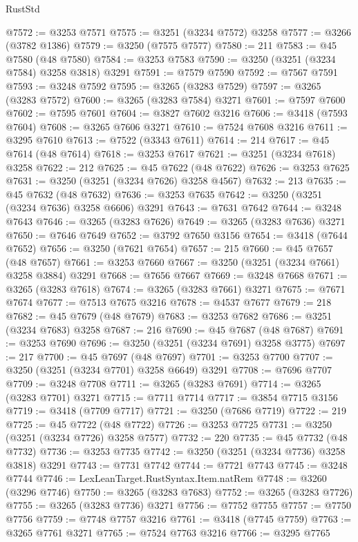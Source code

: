 \begin{lexlean}{RustStd}
\begin{coremodule}
@7572 := @3253 @7571
@7575 := @3251 (@3234 @7572) @3258
@7577 := @3266 (@3782 @1386)
@7579 := @3250 (@7575 @7577)
@7580 := 211
@7583 := @45 @7580 (@48 @7580)
@7584 := @3253 @7583
@7590 := @3250 (@3251 (@3234 @7584) @3258 @3818) @3291
@7591 := @7579 @7590
@7592 := @7567 @7591
@7593 := @3248 @7592
@7595 := @3265 (@3283 @7529)
@7597 := @3265 (@3283 @7572)
@7600 := @3265 (@3283 @7584) @3271
@7601 := @7597 @7600
@7602 := @7595 @7601
@7604 := @3827 @7602 @3216
@7606 := @3418 (@7593 @7604)
@7608 := @3265 @7606 @3271
@7610 := @7524 @7608 @3216
@7611 := @3295 @7610
@7613 := @7522 (@3343 @7611)
@7614 := 214
@7617 := @45 @7614 (@48 @7614)
@7618 := @3253 @7617
@7621 := @3251 (@3234 @7618) @3258
@7622 := 212
@7625 := @45 @7622 (@48 @7622)
@7626 := @3253 @7625
@7631 := @3250 (@3251 (@3234 @7626) @3258 @4567)
@7632 := 213
@7635 := @45 @7632 (@48 @7632)
@7636 := @3253 @7635
@7642 := @3250 (@3251 (@3234 @7636) @3258 @6606) @3291
@7643 := @7631 @7642
@7644 := @3248 @7643
@7646 := @3265 (@3283 @7626)
@7649 := @3265 (@3283 @7636) @3271
@7650 := @7646 @7649
@7652 := @3792 @7650 @3156
@7654 := @3418 (@7644 @7652)
@7656 := @3250 (@7621 @7654)
@7657 := 215
@7660 := @45 @7657 (@48 @7657)
@7661 := @3253 @7660
@7667 := @3250 (@3251 (@3234 @7661) @3258 @3884) @3291
@7668 := @7656 @7667
@7669 := @3248 @7668
@7671 := @3265 (@3283 @7618)
@7674 := @3265 (@3283 @7661) @3271
@7675 := @7671 @7674
@7677 := @7513 @7675 @3216
@7678 := @4537 @7677
@7679 := 218
@7682 := @45 @7679 (@48 @7679)
@7683 := @3253 @7682
@7686 := @3251 (@3234 @7683) @3258
@7687 := 216
@7690 := @45 @7687 (@48 @7687)
@7691 := @3253 @7690
@7696 := @3250 (@3251 (@3234 @7691) @3258 @3775)
@7697 := 217
@7700 := @45 @7697 (@48 @7697)
@7701 := @3253 @7700
@7707 := @3250 (@3251 (@3234 @7701) @3258 @6649) @3291
@7708 := @7696 @7707
@7709 := @3248 @7708
@7711 := @3265 (@3283 @7691)
@7714 := @3265 (@3283 @7701) @3271
@7715 := @7711 @7714
@7717 := @3854 @7715 @3156
@7719 := @3418 (@7709 @7717)
@7721 := @3250 (@7686 @7719)
@7722 := 219
@7725 := @45 @7722 (@48 @7722)
@7726 := @3253 @7725
@7731 := @3250 (@3251 (@3234 @7726) @3258 @7577)
@7732 := 220
@7735 := @45 @7732 (@48 @7732)
@7736 := @3253 @7735
@7742 := @3250 (@3251 (@3234 @7736) @3258 @3818) @3291
@7743 := @7731 @7742
@7744 := @7721 @7743
@7745 := @3248 @7744
@7746 := LexLeanTarget.RustSyntax.Item.natRem
@7748 := @3260 (@3296 @7746)
@7750 := @3265 (@3283 @7683)
@7752 := @3265 (@3283 @7726)
@7755 := @3265 (@3283 @7736) @3271
@7756 := @7752 @7755
@7757 := @7750 @7756
@7759 := @7748 @7757 @3216
@7761 := @3418 (@7745 @7759)
@7763 := @3265 @7761 @3271
@7765 := @7524 @7763 @3216
@7766 := @3295 @7765

\end{coremodule}
\end{lexlean}

